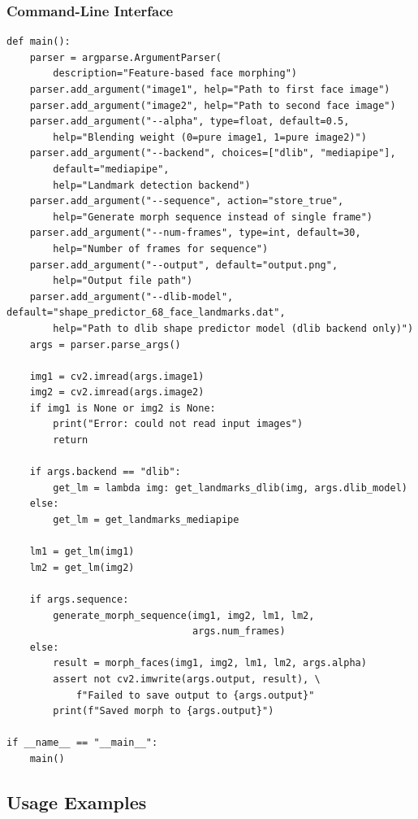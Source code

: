 \subsubsection*{Command-Line Interface}

\begin{verbatim}
def main():
    parser = argparse.ArgumentParser(
        description="Feature-based face morphing")
    parser.add_argument("image1", help="Path to first face image")
    parser.add_argument("image2", help="Path to second face image")
    parser.add_argument("--alpha", type=float, default=0.5,
        help="Blending weight (0=pure image1, 1=pure image2)")
    parser.add_argument("--backend", choices=["dlib", "mediapipe"],
        default="mediapipe",
        help="Landmark detection backend")
    parser.add_argument("--sequence", action="store_true",
        help="Generate morph sequence instead of single frame")
    parser.add_argument("--num-frames", type=int, default=30,
        help="Number of frames for sequence")
    parser.add_argument("--output", default="output.png",
        help="Output file path")
    parser.add_argument("--dlib-model", default="shape_predictor_68_face_landmarks.dat",
        help="Path to dlib shape predictor model (dlib backend only)")
    args = parser.parse_args()

    img1 = cv2.imread(args.image1)
    img2 = cv2.imread(args.image2)
    if img1 is None or img2 is None:
        print("Error: could not read input images")
        return

    if args.backend == "dlib":
        get_lm = lambda img: get_landmarks_dlib(img, args.dlib_model)
    else:
        get_lm = get_landmarks_mediapipe

    lm1 = get_lm(img1)
    lm2 = get_lm(img2)

    if args.sequence:
        generate_morph_sequence(img1, img2, lm1, lm2,
                                args.num_frames)
    else:
        result = morph_faces(img1, img2, lm1, lm2, args.alpha)
        assert not cv2.imwrite(args.output, result), \
            f"Failed to save output to {args.output}"
        print(f"Saved morph to {args.output}")

if __name__ == "__main__":
    main()
\end{verbatim}

\subsection{Usage Examples}

